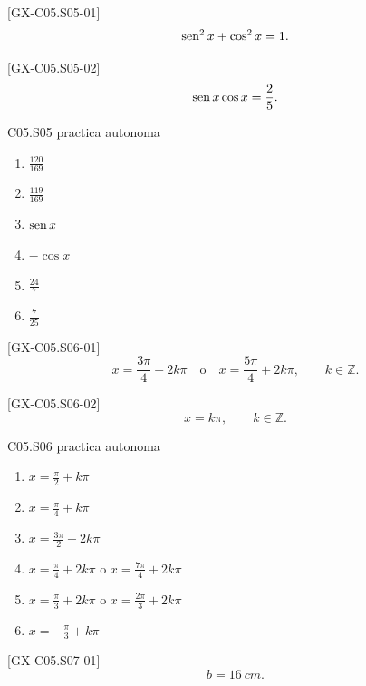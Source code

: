 \begin{shortanswer}{[GX-C05.S05-01]}
\[
\operatorname{sen}^2 x+\cos^2 x=1.
\]
\end{shortanswer}

\begin{shortanswer}{[GX-C05.S05-02]}
\[
\operatorname{sen} x\cos x=\frac{2}{5}.
\]
\end{shortanswer}

\begin{shortanswer}{C05.S05 practica autonoma}
\begin{enumerate}[label=\textbf{PX-C05.S05-\arabic*:}, leftmargin=*]
  \item \(\frac{120}{169}\)
  \item \(\frac{119}{169}\)
  \item \(\operatorname{sen} x\)
  \item \(-\cos x\)
  \item \(\frac{24}{7}\)
  \item \(\frac{7}{25}\)
\end{enumerate}
\end{shortanswer}

\begin{shortanswer}{[GX-C05.S06-01]}
\[
x=\frac{3\pi}{4}+2k\pi
\quad \text{o} \quad
x=\frac{5\pi}{4}+2k\pi,
\qquad k\in\mathbb{Z}.
\]
\end{shortanswer}

\begin{shortanswer}{[GX-C05.S06-02]}
\[
x=k\pi,
\qquad k\in\mathbb{Z}.
\]
\end{shortanswer}

\begin{shortanswer}{C05.S06 practica autonoma}
\begin{enumerate}[label=\textbf{PX-C05.S06-\arabic*:}, leftmargin=*]
  \item \(x=\frac{\pi}{2}+k\pi\)
  \item \(x=\frac{\pi}{4}+k\pi\)
  \item \(x=\frac{3\pi}{2}+2k\pi\)
  \item \(x=\frac{\pi}{4}+2k\pi\) o \(x=\frac{7\pi}{4}+2k\pi\)
  \item \(x=\frac{\pi}{3}+2k\pi\) o \(x=\frac{2\pi}{3}+2k\pi\)
  \item \(x=-\frac{\pi}{3}+k\pi\)
\end{enumerate}
\end{shortanswer}

\begin{shortanswer}{[GX-C05.S07-01]}
\[
b=\SI{16}{cm}.
\]
\end{shortanswer}

